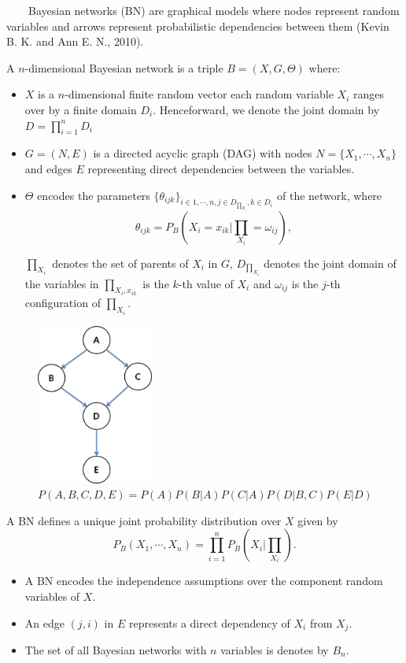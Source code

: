 ~~~~Bayesian networks (BN) are graphical models where nodes represent random variables and arrows represent probabilistic dependencies
between them (Kevin B. K. and Ann E. N., 2010).

A $n$-dimensional Bayesian network is a triple $B = (X, G, \Theta)$ where:

\begin{itemize}
	\item $X$ is a $n$-dimensional finite random vector each random variable $X_{i}$ ranges over by a finite domain $D_{i}$. Henceforward, we denote the joint domain by $D=\prod_{i=1}^{n}D_{i}$
	
	\item $G = (N, E)$ is a directed acyclic graph (DAG) with nodes $N = \{X_{1}, \cdots, X_{n}\}$ and edges $E$ representing direct dependencies between the variables.
	
	\item $\Theta$ encodes the parameters $\{\theta_{ijk}\}_{i\in1,\cdots,n,j\in D_{\prod_{X_{i}}},k\in D_{i}}$ of the network, where
	$$\theta_{ijk}=P_{B}(X_{i}=x_{ik}|\prod_{X_{i}}=\omega_{ij}),$$
	
	$\prod_{X_{i}}$ denotes the set of parents of $X_{i}$ in $G$, $D_{\prod_{X_{i}}}$ denotes the joint domain of the variables in $\prod_{X_{i}, x_{ik}}$ is the $k$-th value of $X_{i}$ and $\omega_{ij}$ is the $j$-th configuration of $\prod_{X_{i}}$.
\end{itemize}

\begin{figure}[!h]
	\centering
		\includegraphics[height=150pt]{images/image01}
		\caption{$P(A,B,C,D,E)=P(A)P(B|A)P(C|A)P(D|B,C)P(E|D)$}
\end{figure}	

A BN defines a unique joint probability distribution over $X$ given by
$$P_{B}(X_{1},\cdots,X_{n})=\prod_{i=1}^{n}P_{B}(X_{i}|\prod_{X_{i}}).$$

\begin{itemize}
	\item A BN encodes the independence assumptions over the component random variables of $X$.
	
	\item An edge $(j, i)$ in $E$ represents a direct dependency of $X_{i}$ from $X_{j}$.
	
	\item The set of all Bayesian networks with $n$ variables is denotes by $B_{n}$.
\end{itemize}
